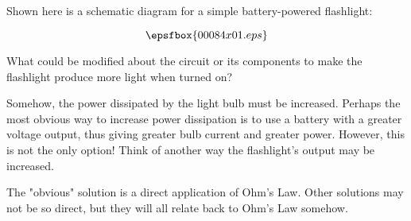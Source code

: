 

Shown here is a schematic diagram for a simple battery-powered flashlight:

$$\epsfbox{00084x01.eps}$$

What could be modified about the circuit or its components to make the flashlight produce more light when turned on?







Somehow, the power dissipated by the light bulb must be increased.  Perhaps the most obvious way to increase power dissipation is to use a battery with a greater voltage output, thus giving greater bulb current and greater power.  However, this is not the only option!  Think of another way the flashlight's output may be increased.







The "obvious" solution is a direct application of Ohm's Law.  Other solutions may not be so direct, but they will all relate back to Ohm's Law somehow.




